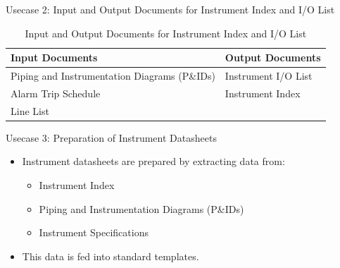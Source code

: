 \documentclass{beamer}
\begin{document}
\begin{frame}{Usecase 2: Input and Output Documents for Instrument Index and I/O List}
    \begin{table}[]
        \centering
        \begin{tabular}{|l|l|}
            \hline
            \textbf{Input Documents} & \textbf{Output Documents} \\
            \hline
            Piping and Instrumentation Diagrams (P\&IDs) & Instrument I/O List \\
            Alarm Trip Schedule & Instrument Index \\
            Line List & \\
            \hline
        \end{tabular}
        \caption{Input and Output Documents for Instrument Index and I/O List}
    \end{table}
\end{frame}

\begin{frame}{Usecase 3: Preparation of Instrument Datasheets}
    \begin{itemize}
        \item Instrument datasheets are prepared by extracting data from:
        \begin{itemize}
            \item Instrument Index
            \item Piping and Instrumentation Diagrams (P\&IDs)
            \item Instrument Specifications
        \end{itemize}
        \item This data is fed into standard templates.
    \end{itemize}
\end{frame}
\end{document}
